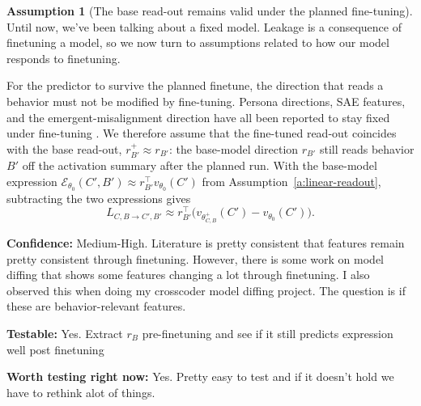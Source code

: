 \documentclass[11pt]{article}
\theoremstyle{definition}
\theoremstyle{definition}
\theoremstyle{assumptionstyle}
\newtheorem{assumption}{Assumption}[section]
\newcommand{\Expr}{\mathcal{E}}        %
\begin{document}
\begin{assumption}[The base read-out remains valid under the planned fine-tuning]
\label{a:readout-stability}
Until now, we've been talking about a fixed model. Leakage is a consequence of finetuning a model, so we now turn to assumptions related to how our model responds to finetuning.

For the predictor to survive the planned finetune, the direction that reads a behavior must not be modified by fine-tuning. Persona directions, SAE features, and the emergent-misalignment direction have all been reported to stay fixed under fine-tuning \cite{chen2025,soligo2025}.
We therefore assume that the fine-tuned read-out coincides with the base read-out,
\(r^+_{B'}\approx r_{B'}\): the base-model direction \(r_{B'}\) still reads
behavior \(B'\) off the activation summary after the planned run. With the
base-model expression \(\Expr_{\theta_0}(C',B')\approx r_{B'}^\top v_{\theta_0}(C')\)
from Assumption~\ref{a:linear-readout}, subtracting the two expressions gives
\[
L_{C,B\to C',B'}
\approx
r_{B'}^\top
\Big(
v_{\theta^+_{C,B}}(C')
-
v_{\theta_0}(C')
\Big).
\]

\textbf{Confidence:} Medium-High. Literature is pretty consistent that features remain pretty consistent through finetuning. However, there is some work on model diffing that shows some features changing a lot through finetuning. I also observed this when doing my crosscoder model diffing project. The question is if these are behavior-relevant features.

\textbf{Testable:} Yes. Extract $r_B$ pre-finetuning and see if it still predicts expression well post finetuning

\textbf{Worth testing right now:} Yes. Pretty easy to test and if it doesn't hold we have to rethink alot of things.
\end{assumption}
\end{document}
